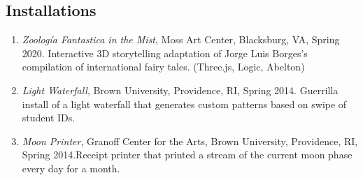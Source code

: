  
   \subsection{Installations}
  \begin{enumerate}
  \item  \emph{Zoolog\'ia Fantastica in the Mist}, Moss Art Center, Blacksburg, VA, Spring 2020. \subitem Interactive 3D storytelling adaptation of Jorge Luis Borges's compilation of international fairy tales. (Three.js, Logic, Abelton)\\
  \item  \emph{Light Waterfall}, Brown University, Providence, RI, Spring 2014. \subitem Guerrilla install of a light waterfall that generates custom patterns based on swipe of student IDs. \\
\item  \emph{Moon Printer}, Granoff Center for the Arts, Brown University, Providence, RI, Spring 2014.\subitem  Receipt printer that printed a stream of the current moon phase every day for a month. \\
 
 \end{enumerate}
 
